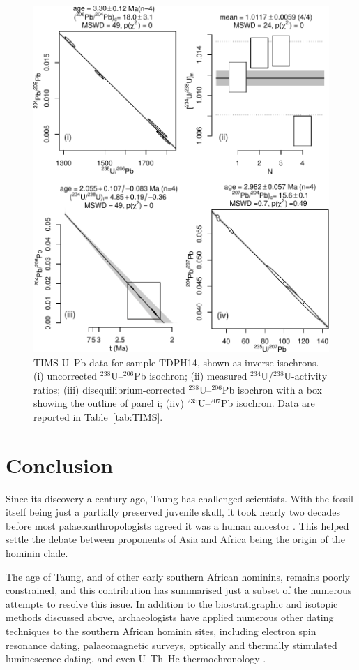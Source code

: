\documentclass[11pt]{article}
\begin{document}
\begin{figure}[!ht]
  \centering
  \includegraphics[width=.8\textwidth]{TIMS.pdf}
  \caption{TIMS U--Pb data for sample TDPH14, shown as inverse
    isochrons. (i) uncorrected ${}^{238}$U--${}^{206}$Pb isochron;
    (ii) measured ${}^{234}$U/${}^{238}$U-activity ratios; (iii)
    disequilibrium-corrected ${}^{238}$U--${}^{206}$Pb isochron with a
    box showing the outline of panel i; (iiv)
    ${}^{235}$U--${}^{207}$Pb isochron. Data are reported in
    Table~\ref{tab:TIMS}.}
  \label{fig:TIMS}
\end{figure}

\section{Conclusion}

Since its discovery a century ago, Taung has challenged
scientists. With the fossil itself being just a partially preserved
juvenile skull, it took nearly two decades before most
palaeoanthropologists agreed it was a human ancestor
\citep{keith1947}. This helped settle the debate between proponents of
Asia and Africa being the origin of the hominin clade.

The age of Taung, and of other early southern African hominins,
remains poorly constrained, and this contribution has summarised just
a subset of the numerous attempts to resolve this issue. In addition
to the biostratigraphic and isotopic methods discussed above,
archaeologists have applied numerous other dating techniques to the
southern African hominin sites, including electron spin resonance
dating, palaeomagnetic surveys, optically and thermally stimulated
luminescence dating, and even U--Th--He thermochronology
\citep{schwarcz1994, herries2011, pickering2013, makhubela2022}.
\end{document}
